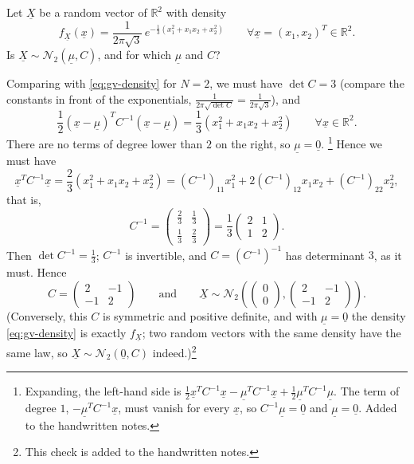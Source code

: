 \begin{example}\label{exa:gv-covariance-from-density}
Let $\underline X$ be a random vector of $\mathbb R^2$ with density
\[
  f_{\underline X}(\underline x)=\frac1{2\pi\sqrt3}\,e^{-\frac13(x_1^2+x_1x_2+x_2^2)}\qquad
  \forall\underline x=(x_1,x_2)^T\in\mathbb R^2 .
\]
Is $\underline X\sim\mathcal N_2(\underline\mu,C)$, and for which $\underline\mu$ and $C$?

Comparing with \eqref{eq:gv-density} for $N=2$, we must have $\det C=3$ (compare the constants in
front of the exponentials, $\frac1{2\pi\sqrt{\det C}}=\frac1{2\pi\sqrt3}$), and
\[
  \frac12(\underline x-\underline\mu)^TC^{-1}(\underline x-\underline\mu)=\frac13(x_1^2+x_1x_2+x_2^2)
  \qquad\forall\underline x\in\mathbb R^2 .
\]
There are no terms of degree lower than $2$ on the right, so $\underline\mu=\underline 0$.%
\footnote{Expanding, the left-hand side is
$\frac12\underline x^TC^{-1}\underline x-\underline\mu^TC^{-1}\underline x+\frac12\underline\mu^TC^{-1}\underline\mu$.
The term of degree $1$, $-\underline\mu^TC^{-1}\underline x$, must vanish for every
$\underline x$, so $C^{-1}\underline\mu=\underline 0$ and $\underline\mu=\underline 0$. Added to
the handwritten notes.} Hence we must have
\[
  \underline x^TC^{-1}\underline x=\frac23(x_1^2+x_1x_2+x_2^2)
  =(C^{-1})_{11}x_1^2+2(C^{-1})_{12}x_1x_2+(C^{-1})_{22}x_2^2 ,
\]
that is,
\[
  C^{-1}=\begin{pmatrix}\frac23&\frac13\\[2pt]\frac13&\frac23\end{pmatrix}=\frac13\begin{pmatrix}2&1\\1&2\end{pmatrix}.
\]
Then $\det C^{-1}=\frac13$; $C^{-1}$ is invertible, and $C=(C^{-1})^{-1}$ has determinant $3$, as it
must. Hence
\[
  C=\begin{pmatrix}2&-1\\-1&2\end{pmatrix}\qquad\text{and}\qquad
  \underline X\sim\mathcal N_2\left(\begin{pmatrix}0\\0\end{pmatrix},\begin{pmatrix}2&-1\\-1&2\end{pmatrix}\right).
\]
(Conversely, this $C$ is symmetric and positive definite, and with $\underline\mu=\underline 0$ the
density \eqref{eq:gv-density} is exactly $f_{\underline X}$; two random vectors with the same
density have the same law, so $\underline X\sim\mathcal N_2(\underline 0,C)$ indeed.)\footnote{This
check is added to the handwritten notes.}
\end{example}

